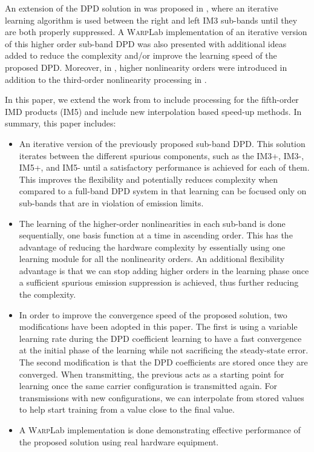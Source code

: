 An extension of the DPD solution in \cite{ICASSP2014,Asilomar2015} was proposed in \cite{Tarver16}, where an iterative learning algorithm is used between the right and left IM3 sub-bands until they are both properly suppressed. 
A \textsc{Warp}Lab implementation of an iterative version of this higher order sub-band DPD was also presented  with additional ideas added to reduce the complexity and/or improve the learning speed of the proposed DPD. 
Moreover, in \cite{TMTT_SubbandDPD}, higher nonlinearity orders were introduced in addition to the third-order nonlinearity processing in \cite{ICASSP2014,Asilomar2015}. 

In this paper, we extend the work from \cite{Tarver16} to include processing for the fifth-order IMD products (IM5) and include new interpolation based speed-up methods. In summary, this paper includes:
\begin{itemize}
	\item An iterative version of the previously proposed sub-band DPD. This solution iterates between the different spurious components, such as the IM3+, IM3-, IM5+, and IM5- until a satisfactory performance is achieved for each of them. This improves the flexibility and potentially reduces complexity when compared to a full-band DPD system in that learning can be focused only on sub-bands that are in violation of emission limits. 
	\item The learning of the higher-order nonlinearities in each sub-band is done sequentially, one basis function at a time in ascending order. 
	This has the advantage of reducing the hardware complexity by essentially using one learning module for all the nonlinearity orders. 
	An additional flexibility advantage is that we can stop adding higher orders in the learning phase once a sufficient spurious emission suppression is achieved, thus further reducing the complexity.
	\item In order to improve the convergence speed of the proposed solution, two modifications have been adopted in this paper. 
	The first is using a variable learning rate during the DPD coefficient learning to have a fast convergence at the initial phase of the learning while not sacrificing the steady-state error. 
	The second modification is that the DPD coefficients are stored once they are converged. When transmitting, the previous acts as a starting point for learning once the same carrier configuration is transmitted again. For transmissions with new configurations, we can interpolate from stored values to help start training from a value close to the final value. 
	\item A \textsc{Warp}Lab implementation is done demonstrating effective performance of the proposed solution using real hardware equipment. 
\end{itemize}

